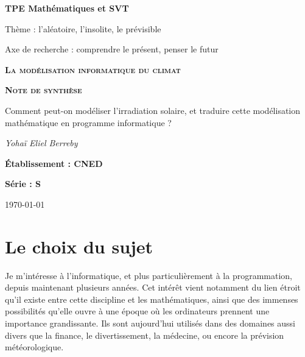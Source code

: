 \documentclass[12pt,a4paper]{article}
\begin{document}
\begin{titlepage}
	\centering
	
	{\huge\bfseries  TPE Mathématiques et SVT\par}
	\vspace{0.2cm}	
	{ \Large Thème : l'aléatoire, l'insolite, le prévisible\par }
	{ \large Axe de recherche : comprendre le présent, penser le futur\par }
	\vspace{1.5cm}

	{\bfseries \scshape\Large La modélisation informatique du climat \par}
	\vspace{1cm}
	
	{\Huge\bfseries  \scshape Note de synthèse \par}
		\vspace{1cm}
		
	
	{\Large Comment peut-on modéliser l'irradiation solaire, et traduire cette modélisation mathématique en programme informatique ?\par}

	\vspace{1cm}
	{\Large\itshape Yohaï Eliel Berreby\par}
	
	\vfill
	
	
	{\Large\bfseries Établissement : CNED\par}
	\vspace{0.2cm}
	{\Large \bfseries Série : S }

	\vfill

	{\large \today\par}
\end{titlepage}




\section{Le choix du sujet}


Je m'intéresse à l'informatique, et plus particulièrement à la programmation, depuis maintenant plusieurs années.
Cet intérêt vient notamment du lien étroit qu'il existe entre cette discipline et les mathématiques, ainsi que des immenses possibilités qu'elle ouvre à une époque où les ordinateurs prennent une importance grandissante.
Ils sont aujourd'hui utilisés dans des domaines aussi divers que la finance, le divertissement, la médecine, ou encore la prévision météorologique.
\end{document}

